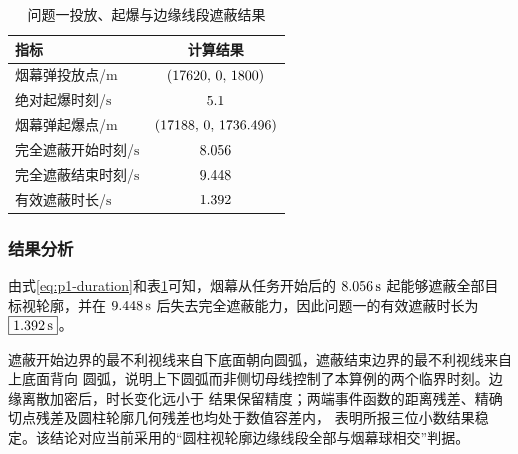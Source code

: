 \begin{table}[htbp]
  \centering
  \caption{问题一投放、起爆与边缘线段遮蔽结果}
  \label{tab:p1-edge-results}
  \begin{tabular}{lc}
    \toprule
    指标 & 计算结果 \\
    \midrule
    烟幕弹投放点/$\mathrm m$ & $(17620,\,0,\,1800)$ \\
    绝对起爆时刻/$\mathrm s$ & $5.1$ \\
    烟幕弹起爆点/$\mathrm m$ & $(17188,\,0,\,1736.496)$ \\
    完全遮蔽开始时刻/$\mathrm s$ & $8.056$ \\
    完全遮蔽结束时刻/$\mathrm s$ & $9.448$ \\
    有效遮蔽时长/$\mathrm s$ & $1.392$ \\
    \bottomrule
  \end{tabular}
\end{table}

\subsubsection{结果分析}

由式\eqref{eq:p1-duration}和表\ref{tab:p1-edge-results}可知，烟幕从任务开始后的
$8.056\,\mathrm s$ 起能够遮蔽全部目标视轮廓，并在
$9.448\,\mathrm s$ 后失去完全遮蔽能力，因此问题一的有效遮蔽时长为
$\boxed{1.392\,\mathrm s}$。

遮蔽开始边界的最不利视线来自下底面朝向圆弧，遮蔽结束边界的最不利视线来自上底面背向
圆弧，说明上下圆弧而非侧切母线控制了本算例的两个临界时刻。边缘离散加密后，时长变化远小于
结果保留精度；两端事件函数的距离残差、精确切点残差及圆柱轮廓几何残差也均处于数值容差内，
表明所报三位小数结果稳定。该结论对应当前采用的“圆柱视轮廓边缘线段全部与烟幕球相交”判据。
